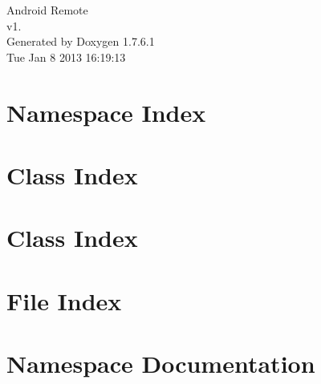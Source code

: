 \documentclass[a4paper]{book}
\begin{document}
\hypersetup{pageanchor=false,citecolor=blue}
\begin{titlepage}
\vspace*{7cm}
\begin{center}
{\Large \-Android \-Remote \\[1ex]\large v1. }\\
\vspace*{1cm}
{\large \-Generated by Doxygen 1.7.6.1}\\
\vspace*{0.5cm}
{\small Tue Jan 8 2013 16:19:13}\\
\end{center}
\end{titlepage}
\clearemptydoublepage
{}
\tableofcontents
\clearemptydoublepage
{}
\hypersetup{pageanchor=true,citecolor=blue}
\chapter{\-Namespace \-Index}

\chapter{\-Class \-Index}

\chapter{\-Class \-Index}

\chapter{\-File \-Index}

\chapter{\-Namespace \-Documentation}






\end{document}
